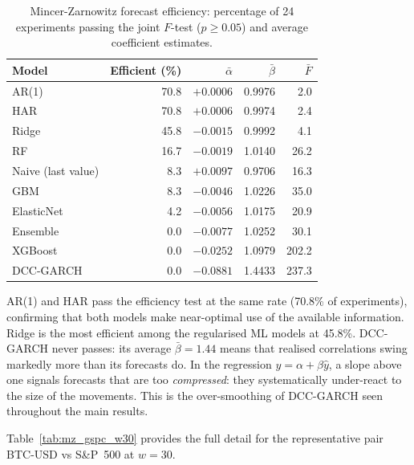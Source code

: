 \begin{table}[H]
    \centering
    \caption{Mincer-Zarnowitz forecast efficiency: percentage of 24 experiments
             passing the joint $F$-test ($p \geq 0.05$) and average coefficient estimates.}
    \label{tab:mz_summary}
    \begin{tabular}{lrrrr}
        \toprule
        Model & Efficient (\%) & $\bar{\alpha}$ & $\bar{\beta}$ & $\bar{F}$ \\
        \midrule
        AR(1)         & 70.8 & $+0.0006$ & 0.9976 &   2.0 \\
        HAR         & 70.8 & $+0.0006$ & 0.9974 &   2.4 \\
        Ridge       & 45.8 & $-0.0015$ & 0.9992 &   4.1 \\
        RF          & 16.7 & $-0.0019$ & 1.0140 &  26.2 \\
        Naive (last value) &  8.3 & $+0.0097$ & 0.9706 &  16.3 \\
        GBM         &  8.3 & $-0.0046$ & 1.0226 &  35.0 \\
        ElasticNet  &  4.2 & $-0.0056$ & 1.0175 &  20.9 \\
        Ensemble    &  0.0 & $-0.0077$ & 1.0252 &  30.1 \\
        XGBoost    &  0.0 & $-0.0252$ & 1.0979 & 202.2 \\
        DCC-GARCH  &  0.0 & $-0.0881$ & 1.4433 & 237.3 \\
        \bottomrule
    \end{tabular}
\end{table}

AR(1) and HAR pass the efficiency test at the same rate (70.8\% of experiments),
confirming that both models make near-optimal use of the available information.
Ridge is the most efficient among the regularised ML models at 45.8\%.
DCC-GARCH never passes: its average $\bar{\beta} = 1.44$ means that realised
correlations swing markedly more than its forecasts do. In the regression
$y = \alpha + \beta\hat{y}$, a slope above one signals forecasts that are too
\emph{compressed}: they systematically under-react to the size of the
movements. This is the over-smoothing of DCC-GARCH seen throughout the main
results.

Table~\ref{tab:mz_gspc_w30} provides the full detail for the representative
pair BTC-USD vs S\&P~500 at $w = 30$.

